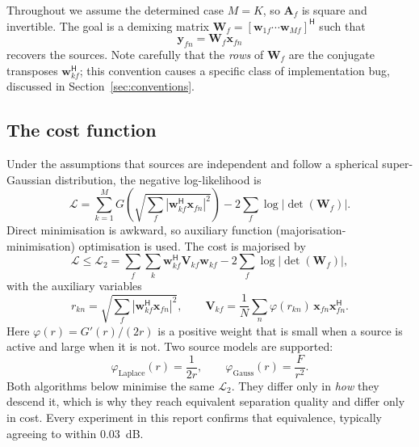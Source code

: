 \documentclass[11pt,a4paper]{article}
\newcommand{\W}{\boldsymbol{W}}
\newcommand{\V}{\boldsymbol{V}}
\newcommand{\x}{\boldsymbol{x}}
\newcommand{\y}{\boldsymbol{y}}
\newcommand{\w}{\boldsymbol{w}}
\newcommand{\herm}{^{\mathsf{H}}}
\begin{document}
Throughout we assume the determined case $M = K$, so $\boldsymbol{A}_f$ is
square and invertible. The goal is a demixing matrix
$\W_f = [\w_{1f} \cdots \w_{Mf}]\herm$ such that
%
\begin{equation}
\y_{fn} = \W_f \x_{fn}
\end{equation}
%
recovers the sources. Note carefully that the \emph{rows} of $\W_f$ are the
conjugate transposes $\w_{kf}\herm$; this convention causes a specific class of
implementation bug, discussed in Section~\ref{sec:conventions}.

\subsection{The cost function}

Under the assumptions that sources are independent and follow a spherical
super-Gaussian distribution, the negative log-likelihood is
%
\begin{equation}
\mathcal{L} = \sum_{k=1}^{M} G\!\left(\sqrt{\textstyle\sum_f |\w_{kf}\herm \x_{fn}|^2}\right)
 - 2\sum_f \log|\det(\W_f)|.
\label{eq:cost}
\end{equation}
%
Direct minimisation is awkward, so auxiliary function (majorisation-minimisation)
optimisation is used. The cost is majorised by
%
\begin{equation}
\mathcal{L} \le \mathcal{L}_2 =
 \sum_{f}\sum_{k} \w_{kf}\herm \V_{kf} \w_{kf} - 2\sum_f \log|\det(\W_f)|,
\label{eq:aux}
\end{equation}
%
with the auxiliary variables
%
\begin{equation}
r_{kn} = \sqrt{\sum_f |\w_{kf}\herm \x_{fn}|^2},
\qquad
\V_{kf} = \frac{1}{N}\sum_n \varphi(r_{kn})\, \x_{fn}\x_{fn}\herm .
\label{eq:auxvars}
\end{equation}
%
Here $\varphi(r) = G'(r)/(2r)$ is a positive weight that is small when a source
is active and large when it is not. Two source models are supported:
%
\begin{equation}
\varphi_{\text{Laplace}}(r) = \frac{1}{2r},
\qquad
\varphi_{\text{Gauss}}(r) = \frac{F}{r^2}.
\label{eq:phi}
\end{equation}
%
Both algorithms below minimise the same $\mathcal{L}_2$. They differ only in
\emph{how} they descend it, which is why they reach equivalent separation
quality and differ only in cost. Every experiment in this report confirms that
equivalence, typically agreeing to within $0.03$~dB.
\end{document}
